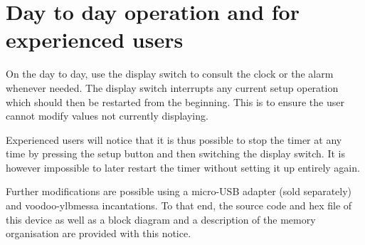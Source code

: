 \section{Day to day operation and for experienced users}
On the day to day, use the display switch to consult the clock or the alarm whenever needed.
The display switch interrupts any current setup operation which should then be restarted from the beginning.
This is to ensure the user cannot modify values not currently displaying.

Experienced users will notice that it is thus possible to stop the timer at any time by pressing the setup button and then switching the display switch. It is however impossible to later restart the timer without setting it up entirely again.

Further modifications are possible using a micro-USB adapter (sold separately) and voodoo-ylbmessa incantations.
To that end, the source code and hex file of this device as well as a block diagram and a description of the memory organisation are provided with this notice.

